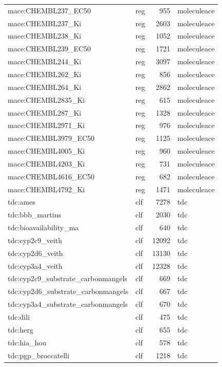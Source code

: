 \begin{table}
\begin{tabular}{llrl}
mace:CHEMBL237\_EC50 & reg & 955 & moleculeace \\
mace:CHEMBL237\_Ki & reg & 2603 & moleculeace \\
mace:CHEMBL238\_Ki & reg & 1052 & moleculeace \\
mace:CHEMBL239\_EC50 & reg & 1721 & moleculeace \\
mace:CHEMBL244\_Ki & reg & 3097 & moleculeace \\
mace:CHEMBL262\_Ki & reg & 856 & moleculeace \\
mace:CHEMBL264\_Ki & reg & 2862 & moleculeace \\
mace:CHEMBL2835\_Ki & reg & 615 & moleculeace \\
mace:CHEMBL287\_Ki & reg & 1328 & moleculeace \\
mace:CHEMBL2971\_Ki & reg & 976 & moleculeace \\
mace:CHEMBL3979\_EC50 & reg & 1125 & moleculeace \\
mace:CHEMBL4005\_Ki & reg & 960 & moleculeace \\
mace:CHEMBL4203\_Ki & reg & 731 & moleculeace \\
mace:CHEMBL4616\_EC50 & reg & 682 & moleculeace \\
mace:CHEMBL4792\_Ki & reg & 1471 & moleculeace \\
tdc:ames & clf & 7278 & tdc \\
tdc:bbb\_martins & clf & 2030 & tdc \\
tdc:bioavailability\_ma & clf & 640 & tdc \\
tdc:cyp2c9\_veith & clf & 12092 & tdc \\
tdc:cyp2d6\_veith & clf & 13130 & tdc \\
tdc:cyp3a4\_veith & clf & 12328 & tdc \\
tdc:cyp2c9\_substrate\_carbonmangels & clf & 669 & tdc \\
tdc:cyp2d6\_substrate\_carbonmangels & clf & 667 & tdc \\
tdc:cyp3a4\_substrate\_carbonmangels & clf & 670 & tdc \\
tdc:dili & clf & 475 & tdc \\
tdc:herg & clf & 655 & tdc \\
tdc:hia\_hou & clf & 578 & tdc \\
tdc:pgp\_broccatelli & clf & 1218 & tdc \\
\bottomrule
\end{tabular}
\end{table}
